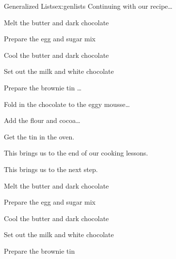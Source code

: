 \begin{texexample}{Generalized Lists}{ex:genlists}
Continuing with our recipe\ldots

\makeatletter
\def\usecounter#1{\@nmbrlisttrue\def\@listctr{#1}}


\begin{list}{\bfseries\upshape Step :}%
{ 
\usecounter{steps}
\setlength{\itemsep}{0ex} 
\setlength{\labelwidth}{2cm}
\setlength{\leftmargin}{2.6cm}
\setlength{\labelsep}{0.5cm}
\setlength{\rightmargin}{1cm}
\setlength{\parsep}{0.5ex plus.2pt}
 }
\item Melt the butter and dark chocolate
\item Prepare the egg and sugar mix
\item Cool the butter and dark chocolate
\item Set out the milk and white chocolate
\item Prepare the brownie tin
      \ldots
\item Fold in the chocolate to the eggy mousse\ldots
\item Add the flour and cocoa\ldots
\item Get the tin in the oven.

\end{list}
\makeatother


This brings us to the end of our cooking lessons.
\end{texexample}

This brings us to the next step. 

\makeatletter
\gdef\resume{\def\usecounter##1{\@nmbrlisttrue\def\@listctr{##1}}\relax}
\gdef\reset{\def\usecounter##1{\@nmbrlisttrue\def\@listctr{##1}\setcounter{##1}{0}\relax}}
\makeatother

\resume
\begin{list}{\bfseries\upshape A :}
{%
\usecounter{steps}
\setlength{\labelwidth}{2cm}\setlength{\leftmargin}{2.6cm}
\setlength{\labelsep}{0.5cm}\setlength{\rightmargin}{1cm}
\setlength{\parsep}{0.5ex plus0.2ex minus0.1ex}
\setlength{\itemsep}{0ex plus0.2ex minus0pt}\relax \slshape %
}
\item Melt the butter and dark chocolate
\item Prepare the egg and sugar mix
\item Cool the butter and dark chocolate
\item Set out the milk and white chocolate
\item Prepare the brownie tin
\end{list}

